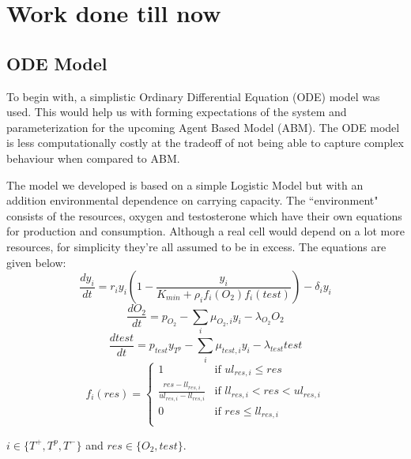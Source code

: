 \documentclass[11pt,a4paper]{article}
\begin{document}
\section{Work done till now}
\subsection{ODE Model}
To begin with, a simplistic Ordinary Differential Equation (ODE) model was used. This would help us with forming expectations of the system and parameterization for the upcoming Agent Based Model (ABM). The ODE model is less computationally costly at the tradeoff of not being able to capture complex behaviour when compared to ABM.

The model we developed is based on a simple Logistic Model \cite{Logistic} but with an addition environmental dependence on carrying capacity. The ``environment" consists of the resources, oxygen and testosterone which have their own equations for production and consumption. Although a real cell would depend on a lot more resources, for simplicity they're all assumed to be in excess. The equations are given below:
\begin{equation}
  \frac{dy_i}{dt} = r_i y_i (1 - \frac{y_i}{K_{min} + \rho_i f_i(O_2) f_i(test)} )- \delta_i y_i
  \label{celleq}
\end{equation}
\begin{equation}
  \frac{dO_2}{dt} = p_{O_2} - \sum_i \mu_{O_2,i} y_i - \lambda_{O_2} O_2
  \label{o2eq}
\end{equation}
\begin{equation}
  \frac{dtest}{dt} = p_{test} y_{T^p} - \sum_i \mu_{test,i} y_i - \lambda_{test} test
  \label{testeq}
\end{equation}
\begin{equation}
  f_i(res) = \begin{cases}
    1 &\text{if } ul_{res,i} \leq res\\
    \frac{res-ll_{res,i}}{ul_{res,i}-ll_{res,i}} &\text{if } ll_{res,i} < res < ul_{res,i}\\
    0 &\text{if } res \leq ll_{res,i}\\
  \end{cases}
  \label{freseq}
\end{equation}

$i \in \{T^+,T^p,T^-\}$ and $res \in \{O_2,test\}$.
\end{document}
